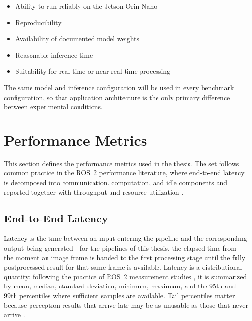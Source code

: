 \begin{itemize}
  \item Ability to run reliably on the Jetson Orin Nano
  \item Reproducibility
  \item Availability of documented model weights
  \item Reasonable inference time
  \item Suitability for real-time or near-real-time processing
\end{itemize}


The same model and inference configuration will be used in every benchmark
configuration, so that application architecture is the only primary
difference between experimental conditions.

\section{Performance Metrics}
\label{sec:metrics}

This section defines the performance metrics used in the thesis. The set
follows common practice in the ROS~2 performance literature, where
end-to-end latency is decomposed into communication, computation, and idle
components \cite{betz2023a} and reported together with throughput and
resource utilization \cite{mayoral-vilches2024, macenski2022}.

\subsection{End-to-End Latency}

Latency is the time between an input entering the pipeline and the
corresponding output being generated---for the pipelines of this thesis,
the elapsed time from the moment an image frame is handed to the first
processing stage until the fully postprocessed result for that same frame
is available. Latency is a distributional quantity: following the practice
of ROS~2 measurement studies \cite{kronauer2021, macenski2022}, it is
summarized by mean, median, standard deviation, minimum, maximum, and the
95th and 99th percentiles where sufficient samples are available. Tail
percentiles matter because perception results that arrive late may be as
unusable as those that never arrive \cite{betz2023a}.

